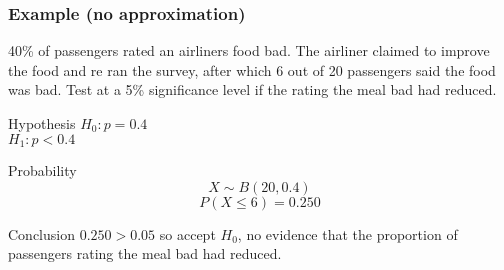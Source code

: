         \subsubsection{Example (no approximation)}
        \begin{example}
        {
            40\% of passengers rated an airliners food bad. The airliner claimed to improve the food and re ran the survey, after which 6 out of 20 passengers said the food was bad. Test at a 5\% significance level if the rating the meal bad had reduced.
        }

        \begin{step}{Hypothesis}
        $H_0: p = 0.4$ \\
        $H_1: p < 0.4$
        \end{step}

        \begin{step}{Probability}
        $$X \sim B(20, 0.4)$$
        $$P(X \leq 6) = 0.250$$
        \end{step}

        \begin{step}{Conclusion}
        $0.250 > 0.05$ so accept $H_0$, no evidence that the proportion of passengers rating the meal bad had reduced.
        \end{step}

        \end{example}

